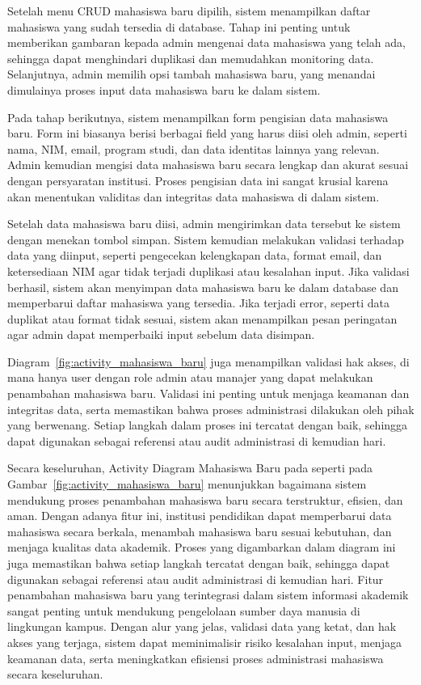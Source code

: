 \documentclass[a4paper,oneside,11pt]{book}
\begin{document}
Setelah menu CRUD mahasiswa baru dipilih, sistem menampilkan daftar mahasiswa yang sudah tersedia di database. Tahap ini penting untuk memberikan gambaran kepada admin mengenai data mahasiswa yang telah ada, sehingga dapat menghindari duplikasi dan memudahkan monitoring data. Selanjutnya, admin memilih opsi tambah mahasiswa baru, yang menandai dimulainya proses input data mahasiswa baru ke dalam sistem.

Pada tahap berikutnya, sistem menampilkan form pengisian data mahasiswa baru. Form ini biasanya berisi berbagai field yang harus diisi oleh admin, seperti nama, NIM, email, program studi, dan data identitas lainnya yang relevan. Admin kemudian mengisi data mahasiswa baru secara lengkap dan akurat sesuai dengan persyaratan institusi. Proses pengisian data ini sangat krusial karena akan menentukan validitas dan integritas data mahasiswa di dalam sistem.

Setelah data mahasiswa baru diisi, admin mengirimkan data tersebut ke sistem dengan menekan tombol simpan. Sistem kemudian melakukan validasi terhadap data yang diinput, seperti pengecekan kelengkapan data, format email, dan ketersediaan NIM agar tidak terjadi duplikasi atau kesalahan input. Jika validasi berhasil, sistem akan menyimpan data mahasiswa baru ke dalam database dan memperbarui daftar mahasiswa yang tersedia. Jika terjadi error, seperti data duplikat atau format tidak sesuai, sistem akan menampilkan pesan peringatan agar admin dapat memperbaiki input sebelum data disimpan.

Diagram~\ref{fig:activity_mahasiswa_baru} juga menampilkan validasi hak akses, di mana hanya user dengan role admin atau manajer yang dapat melakukan penambahan mahasiswa baru. Validasi ini penting untuk menjaga keamanan dan integritas data, serta memastikan bahwa proses administrasi dilakukan oleh pihak yang berwenang. Setiap langkah dalam proses ini tercatat dengan baik, sehingga dapat digunakan sebagai referensi atau audit administrasi di kemudian hari.

Secara keseluruhan, Activity Diagram Mahasiswa Baru pada seperti pada Gambar~\ref{fig:activity_mahasiswa_baru} menunjukkan bagaimana sistem mendukung proses penambahan mahasiswa baru secara terstruktur, efisien, dan aman. Dengan adanya fitur ini, institusi pendidikan dapat memperbarui data mahasiswa secara berkala, menambah mahasiswa baru sesuai kebutuhan, dan menjaga kualitas data akademik. Proses yang digambarkan dalam diagram ini juga memastikan bahwa setiap langkah tercatat dengan baik, sehingga dapat digunakan sebagai referensi atau audit administrasi di kemudian hari. Fitur penambahan mahasiswa baru yang terintegrasi dalam sistem informasi akademik sangat penting untuk mendukung pengelolaan sumber daya manusia di lingkungan kampus. Dengan alur yang jelas, validasi data yang ketat, dan hak akses yang terjaga, sistem dapat meminimalisir risiko kesalahan input, menjaga keamanan data, serta meningkatkan efisiensi proses administrasi mahasiswa secara keseluruhan.
\end{document}
